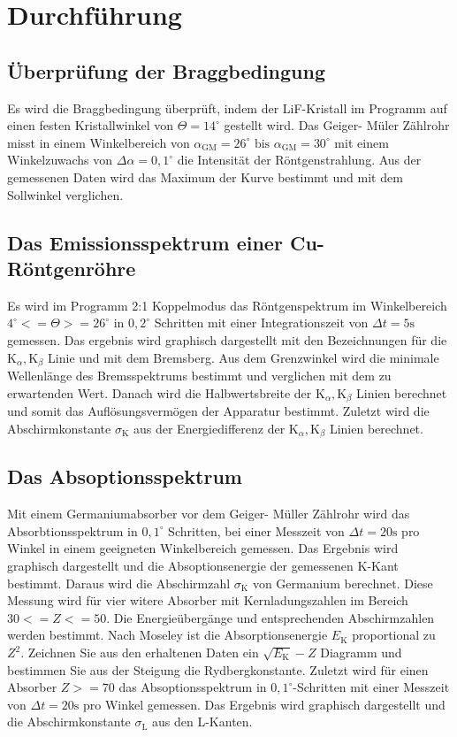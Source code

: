 \section{Durchführung}
\label{sec:Durchführung}
\subsection{Überprüfung der Braggbedingung}
Es wird die Braggbedingung überprüft, indem der LiF-Kristall im Programm auf einen festen Kristallwinkel von $\Theta = 14^\circ$ gestellt wird.
Das Geiger- Müler Zählrohr misst in einem Winkelbereich von ${\alpha}_{\text{GM}} = 26^\circ \text{ bis } {\alpha}_{\text{GM}} = 30^\circ$ mit einem Winkelzuwachs von $\Delta \alpha = 0,1^\circ$ die Intensität der Röntgenstrahlung.
Aus der gemessenen Daten wird das Maximum der Kurve bestimmt und mit dem Sollwinkel verglichen.
\subsection{Das Emissionsspektrum einer Cu-Röntgenröhre}
Es wird im Programm 2:1 Koppelmodus das Röntgenspektrum im Winkelbereich $4^\circ <= \Theta >= 26^\circ$ in $0,2^\circ$ Schritten mit einer Integrationszeit von $\Delta t = 5 \text{s}$ gemessen.
Das ergebnis wird graphisch dargestellt mit den Bezeichnungen für die $\text{K}_{\alpha},\text{K}_{\beta}$ Linie und mit dem Bremsberg.
Aus dem Grenzwinkel wird die minimale Wellenlänge des Bremsspektrums bestimmt und verglichen mit dem zu erwartenden Wert.
Danach wird die Halbwertsbreite der $\text{K}_{\alpha},\text{K}_{\beta}$ Linien berechnet und somit das Auflösungsvermögen der Apparatur bestimmt.
Zuletzt wird die Abschirmkonstante ${\sigma}_\text{K}$ aus der Energiedifferenz der $\text{K}_{\alpha},\text{K}_{\beta}$ Linien berechnet.
\subsection{Das Absoptionsspektrum}
Mit einem Germaniumabsorber vor dem Geiger- Müller Zählrohr wird das Absorbtionsspektrum in $0,1^\circ$ Schritten, bei einer Messzeit von $\Delta t = 20 \text{s}$ pro Winkel in einem geeigneten Winkelbereich gemessen.
Das Ergebnis wird graphisch dargestellt und die Absoptionsenergie der gemessenen K-Kant bestimmt.
Daraus wird die Abschirmzahl ${\sigma}_{\text{K}}$ von Germanium berechnet.
Diese Messung wird für vier witere Absorber mit Kernladungszahlen im Bereich $30 <= Z <= 50$.
Die Energieübergänge und entsprechenden Abschirmzahlen werden bestimmt.
Nach Moseley ist die Absorptionsenergie $E_{\text{K}}$ proportional zu $Z^2$.
Zeichnen Sie aus den erhaltenen Daten ein $\sqrt{E_{\text{K}}} - Z$ Diagramm und bestimmen Sie aus der Steigung die Rydbergkonstante.
Zuletzt wird für einen Absorber $Z >= 70 $ das Absoptionsspektrum in $0,1^\circ$-Schritten mit einer Messzeit von $\Delta t = 20 \text{s}$ pro Winkel gemessen.
Das Ergebnis wird graphisch dargestellt und die Abschirmkonstante ${\sigma}_{\text{L}}$ aus den L-Kanten.